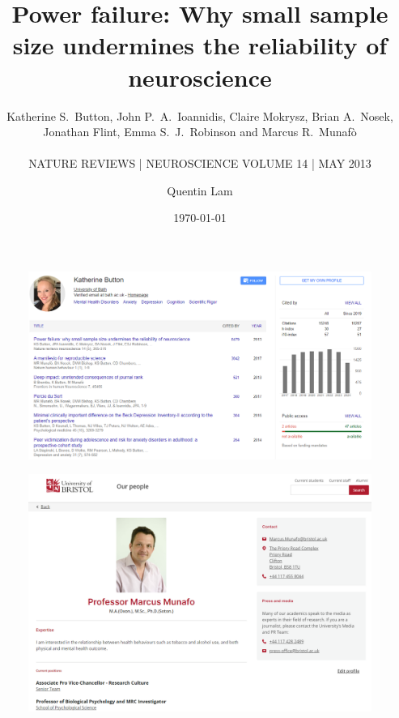 \documentclass{beamer}
\title{Power failure: Why small sample size undermines the reliability of neuroscience}
\subtitle{Katherine S. Button, John P. A. Ioannidis, Claire Mokrysz, Brian A. Nosek, Jonathan Flint, Emma S. J. Robinson and Marcus R. Munafò \\~\\ NATURE REVIEWS | NEUROSCIENCE VOLUME 14 | MAY 2013}
\date{\today}
\author{Quentin Lam}
\begin{document}
    \maketitle
    
    \begin{frame}
    	\begin{figure}[H]
    		\centering
    		\includegraphics[width=1\textwidth]{pics/first author.png}
    	\end{figure}
    \end{frame}
    
    \begin{frame}
    	\begin{figure}[H]
    		\centering
    		\includegraphics[width=1\textwidth]{pics/corrspondence author.png}
    	\end{figure}
    \end{frame}
    
    \tableofcontents
\end{document}
